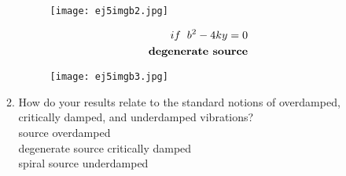 \documentclass[a4paper,10pt]{article}
\begin{document}
\begin{enumerate}
\begin{enumerate}
\begin{figure}[h]
                    \centering
                    \texttt{[image: ej5imgb2.jpg]}
                    \label{fig:mesh1}
                \end{figure}
                \begin{equation}
                    \begin{aligned}
                        if\hspace{0.2cm} b^{2}-4ky = 0\\
                        \textbf{degenerate source}
                    \end{aligned}
                \end{equation}
                \newpage
                \begin{figure}[h]
                    \centering
                    \texttt{[image: ej5imgb3.jpg]}
                    \label{fig:mesh1}
                \end{figure}
            \item How do your results relate to the standard notions of overdamped, critically damped, and underdamped vibrations?\\
                source \xrightarrow{} overdamped\\
                degenerate source \xrightarrow{} critically damped\\
                spiral source \xrightarrow{} underdamped 
            
        \end{enumerate}
        
        
    

\end{enumerate}
\end{document}
